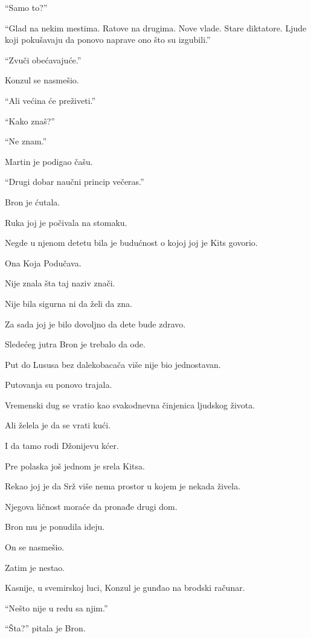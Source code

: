 ``Samo to?''

``Glad na nekim mestima. Ratove na drugima. Nove vlade. Stare diktatore. Ljude koji pokušavaju da ponovo naprave ono što su izgubili.''

``Zvuči obećavajuće.''

Konzul se nasmešio.

``Ali većina će preživeti.''

``Kako znaš?''

``Ne znam.''

Martin je podigao čašu.

``Drugi dobar naučni princip večeras.''

\bigskip

Bron je ćutala.

Ruka joj je počivala na stomaku.

Negde u njenom detetu bila je budućnost o kojoj joj je Kits govorio.

Ona Koja Podučava.

Nije znala šta taj naziv znači.

Nije bila sigurna ni da želi da zna.

Za sada joj je bilo dovoljno da dete bude zdravo.

\bigskip

Sledećeg jutra Bron je trebalo da ode.

Put do Lususa bez dalekobacača više nije bio jednostavan.

Putovanja su ponovo trajala.

Vremenski dug se vratio kao svakodnevna činjenica ljudskog života.

Ali želela je da se vrati kući.

I da tamo rodi Džonijevu kćer.

\bigskip

Pre polaska još jednom je srela Kitsa.

Rekao joj je da Srž više nema prostor u kojem je nekada živela.

Njegova ličnost moraće da pronađe drugi dom.

Bron mu je ponudila ideju.

On se nasmešio.

Zatim je nestao.

\bigskip

Kasnije, u svemirskoj luci, Konzul je gunđao na brodski računar.

``Nešto nije u redu sa njim.''

``Šta?'' pitala je Bron.

